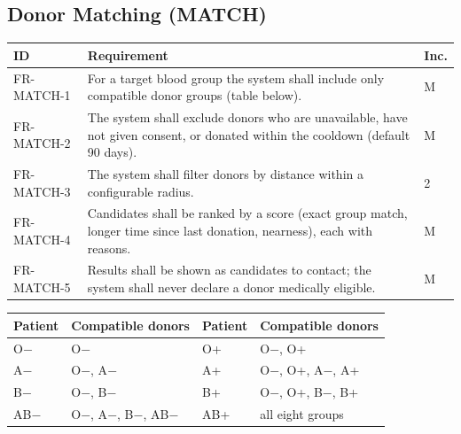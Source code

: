 \documentclass{scrreprt}
\begin{document}
\subsection*{Donor Matching (MATCH)}
\begin{longtable}{@{}l L{11.6cm} l@{}}
\toprule
\textbf{ID} & \textbf{Requirement} & \textbf{Inc.}\\
\midrule
\endhead
FR-MATCH-1 & For a target blood group the system shall include only compatible donor groups (table below). & M\\
FR-MATCH-2 & The system shall exclude donors who are unavailable, have not given consent, or donated within the cooldown (default 90 days). & M\\
FR-MATCH-3 & The system shall filter donors by distance within a configurable radius. & 2\\
FR-MATCH-4 & Candidates shall be ranked by a score (exact group match, longer time since last donation, nearness), each with reasons. & M\\
FR-MATCH-5 & Results shall be shown as candidates to contact; the system shall never declare a donor medically eligible. & M\\
\bottomrule
\end{longtable}
\begin{center}
\small
\begin{tabular}{@{}ll@{\qquad}ll@{}}
\toprule
\textbf{Patient} & \textbf{Compatible donors} & \textbf{Patient} & \textbf{Compatible donors}\\
\midrule
O$-$ & O$-$ & O+ & O$-$, O+\\
A$-$ & O$-$, A$-$ & A+ & O$-$, O+, A$-$, A+\\
B$-$ & O$-$, B$-$ & B+ & O$-$, O+, B$-$, B+\\
AB$-$ & O$-$, A$-$, B$-$, AB$-$ & AB+ & all eight groups\\
\bottomrule
\end{tabular}
\end{center}
\end{document}
